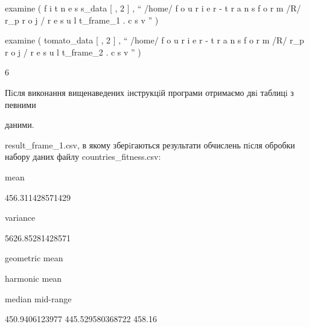 \documentclass[a4paper,portrait,12pt]{article}
\begin{document}
\begin{flushleft}
examine ( f i t n e s s\_data [ , 2 ] , {``} /home/ f o u r i e r - t r a n s f o r m /R/ r\_p r o j / r e s u l t\_frame\_1 . c s v '' )
\end{flushleft}


\begin{flushleft}
examine ( tomato\_data [ , 2 ] , {``} /home/ f o u r i e r - t r a n s f o r m /R/ r\_p r o j / r e s u l t\_frame\_2 . c s v '' )
\end{flushleft}





6





\begin{flushleft}
\newpage
Пiсля виконання вищенаведених iнструкцiй програми отримаємо двi таблицi з певними
\end{flushleft}


\begin{flushleft}
даними.
\end{flushleft}


\begin{flushleft}
result\_frame\_1.csv, в якому зберiгаються результати обчислень пiсля обробки набору даних файлу countries\_fitness.csv:
\end{flushleft}


\begin{flushleft}
mean
\end{flushleft}


456.311428571429


\begin{flushleft}
variance
\end{flushleft}


5626.85281428571





\begin{flushleft}
geometric mean
\end{flushleft}


\begin{flushleft}
harmonic mean
\end{flushleft}


\begin{flushleft}
median mid-range
\end{flushleft}


450.9406123977 445.529580368722 458.16
\end{document}

